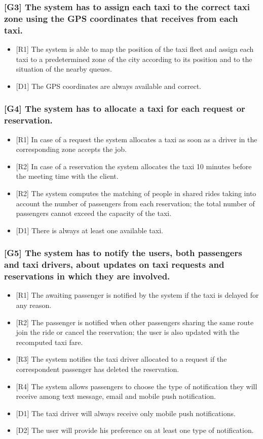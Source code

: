 \documentclass[a4paper,11pt]{report} %
\begin{document}
	\subsubsection{{[}G3{]} The system has to assign each taxi to the correct taxi zone using the GPS coordinates that receives from each taxi.}
	\begin{itemize}
		\item {[}R1{]} The system is able to map the position of the taxi fleet and assign each taxi to a predetermined zone of the city according to its position and to the situation of the nearby queues.
		\item {[}D1{]} The GPS coordinates are always available and correct.
	\end{itemize}
	
	\subsubsection{{[}G4{]} The system has to allocate a taxi for each request or reservation.}
	\begin{itemize}
		\item {[}R1{]} In case of a request the system allocates a taxi as soon as a driver in the corresponding zone accepts the job.
		\item {[}R2{]} In case of a reservation the system allocates the taxi 10 minutes before the meeting time with the client.
		\item {[}R2{]} The system computes the matching of people in shared rides taking into account the number of passengers from each reservation; the total number of passengers cannot exceed the capacity of the taxi.
		\item {[}D1{]} There is always at least one available taxi.
	\end{itemize}
		
	\subsubsection{{[}G5{]} The system has to notify the users, both passengers and taxi drivers, about updates on taxi requests and reservations in which they are involved.}
	\begin{itemize}
		\item {[}R1{]} The awaiting passenger is notified by the system if the taxi is delayed for any reason.
		\item {[}R2{]} The passenger is notified when other passengers sharing the same route join the ride or cancel the reservation; the user is also updated with the recomputed taxi fare.
		\item {[}R3{]} The system notifies the taxi driver allocated to a request if the correspondent passenger has deleted the reservation.
		\item {[}R4{]} The system allows passengers to choose the type of notification they will receive among text message, email and mobile push notification.
		\item {[}D1{]} The taxi driver will always receive only mobile push notifications.
		\item {[}D2{]} The user will provide his preference on at least one type of notification.
	\end{itemize}
		
\end{document}
